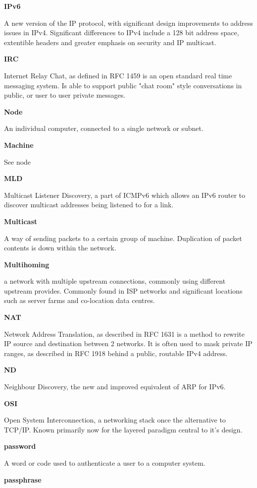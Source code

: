 \textbf{IPv6}

A new version of the IP protocol, with significant design improvements
to address issues in IPv4. Significant differences to IPv4 include a
128 bit address space, extentible headers and greater emphasis on 
security and IP multicast.

\textbf{IRC}

Internet Relay Chat, as defined in RFC 1459 is an open standard real
time messaging system. Is able to support public "chat room" style
conversations in public, or user to user private messages.

\textbf{Node}

An individual computer, connected to a single network or subnet.

\textbf{Machine}

See node

\textbf{MLD}

Multicast Listener Discovery, a part of ICMPv6 which allows an IPv6
router to discover multicast addresses being listened to for a link.

\textbf{Multicast}

A way of sending packets to a certain group of machine. Duplication of
packet contents is down within the network.

\textbf{Multihoming}

a network with multiple upstream connections, commonly using different
upstream provides. Commonly found in ISP networks and significant
locations such as server farms and co-location data centres.

\textbf{NAT}

Network Address Translation, as described in RFC 1631 is a method
to rewrite IP source and destination between 2 networks. It is often
used to mask private IP ranges, as described in RFC 1918 behind a 
public, routable IPv4 address. 

\textbf{ND}

Neighbour Discovery, the new and improved equivalent of ARP for IPv6.

\textbf{OSI}

Open System Interconnection, a networking stack once the alternative to
TCP/IP. Known primarily now for the layered paradigm central to it's
design.

\textbf{password}

A word or code used to authenticate a user to a computer system.

\textbf{passphrase}

